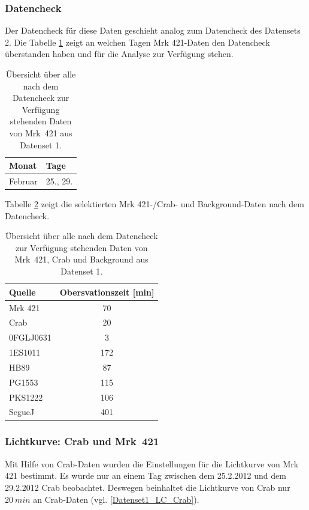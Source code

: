 \subsubsection{Datencheck}
Der Datencheck für diese Daten geschieht analog zum Datencheck des Datensets 2. 
Die Tabelle \ref{tab:Datenset1-Mrk421} zeigt an welchen Tagen Mrk 421-Daten den Datencheck überstanden haben und für die Analyse zur Verfügung stehen. 

\begin{table}[!h]
\centering
\caption{Übersicht über alle nach dem Datencheck zur Verfügung stehenden Daten von Mrk~421 aus Datenset 1.}
\label{tab:Datenset1-Mrk421}
\begin{tabular}{ll}
  \toprule
  Monat & Tage\\
  \midrule
  \midrule
Februar & 25., 29.\\
  \bottomrule
\end{tabular}
\end{table}


Tabelle \ref{tab:Datenset1} zeigt die selektierten Mrk 421-/Crab- und Background-Daten nach dem Datencheck.


\begin{table}[!h]
\centering
\caption{Übersicht über alle nach dem Datencheck zur Verfügung stehenden Daten von Mrk~421, Crab und Background aus Datenset 1.}
\label{tab:Datenset1}
\begin{tabular}{lc}
  \toprule
  Quelle & Obersvationszeit [min]\\
  \midrule
  \midrule
  Mrk 421 & 70\\
  \midrule
  Crab & 20\\
  \midrule
  0FGLJ0631 & 3 \\
  1ES1011 & 172 \\
  HB89 & 87 \\
  PG1553 & 115 \\
  PKS1222 & 106 \\
  SegueJ & 401 \\
  \bottomrule
\end{tabular}
\end{table}

\subsubsection{Lichtkurve: Crab und Mrk~421}
Mit Hilfe von Crab-Daten wurden die Einstellungen für die Lichtkurve von Mrk 421 bestimmt.
Es wurde nur an einem Tag zwischen dem 25.2.2012 und dem 29.2.2012 Crab beobachtet.
Deswegen beinhaltet die Lichtkurve von Crab nur $\SI{20}{min}$ an Crab-Daten (vgl. \autoref{Datenset1_LC_Crab}).


